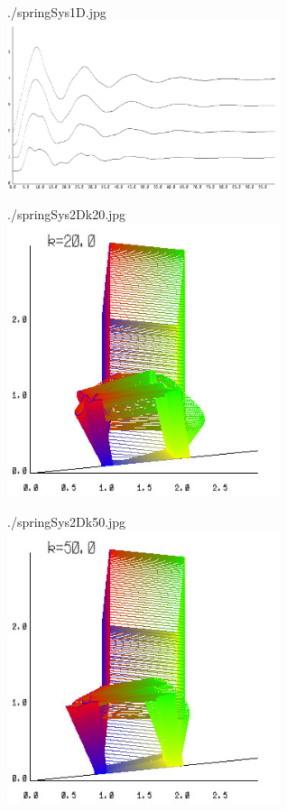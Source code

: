 \documentclass[12pt, a4paper]{article}
\begin{document}
\begin{center}
./springSys1D.jpg\\
\includegraphics[width=8cm]{./springSys1D.jpg}
\end{center} 

\begin{center}
./springSys2Dk20.jpg\\
\includegraphics[width=8cm]{./springSys2Dk20.jpg}
\end{center} 
\newpage
\begin{center}
./springSys2Dk50.jpg\\
\includegraphics[width=8cm]{./springSys2Dk50.jpg}
\end{center} 
\end{document}
